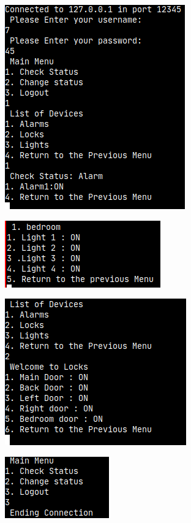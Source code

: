 \documentclass[11pt]{article}
\begin{document}
	\begin{figure}[H]
		\centering
		\includegraphics[scale=0.7]{"testing_check alarm"}
		\caption[Testing checking the alarm]{}
		\label{fig:testingcheck-alarm}
	\end{figure}
	\begin{figure}[H]
		\centering
		\includegraphics[scale=0.7]{testing_checkbedroom_lights}
		\caption[Testing check the bedroom lights]{}
		\label{fig:testingcheckbedroomlights}
	\end{figure}
	\begin{figure}[H]
		\centering
		\includegraphics[scale=0.7]{testing_checklock}
		\caption[Testing check the lock status]{}
		\label{fig:testingchecklock}
	\end{figure}
	\begin{figure}[H]
		\centering
		\includegraphics[scale=0.7]{testing_ending_connection}
		\caption[Testing ending connection]{}
		\label{fig:testingendingconnection}
	\end{figure}
\end{document}
